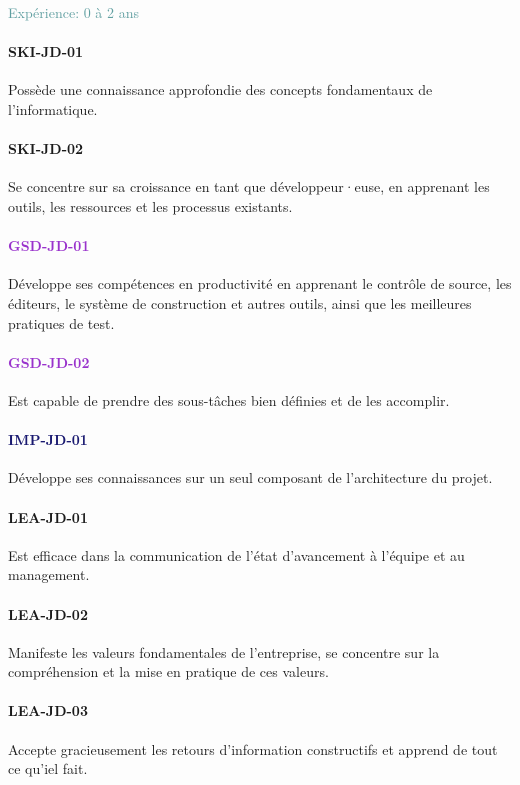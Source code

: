 \documentclass[a4paper, french, openany, 12pt]{book}
\newcommand\dex[1]{\textcolor{BrickRed}{\textbf{\uppercase{ski-{#1}}}}}
\newcommand\str[1]{\textcolor{DarkOrchid}{\textbf{\uppercase{gsd-{#1}}}}}
\newcommand\wis[1]{\textcolor{MidnightBlue}{\textbf{\uppercase{imp-{#1}}}}}
\newcommand\cha[1]{\textcolor{OliveGreen}{\textbf{\uppercase{lea-{#1}}}}}
\newcommand\xp[1]{\textcolor{CadetBlue}{Expérience: {#1} ans}}
\newcommand\dev{développeur·euse}
\begin{document}
\xp{0 à 2}

\begin{multicols}{2}

  \paragraph{\dex{jd-01}} 

  Possède une connaissance approfondie des concepts fondamentaux de l'informatique.

  \paragraph{\dex{jd-02}} 

  Se concentre sur sa croissance en tant que \dev, en apprenant les outils, les ressources et les processus 
  existants.

  \paragraph{\str{jd-01}}

  Développe ses compétences en productivité en apprenant le contrôle de source, les éditeurs, le système de construction 
  et autres outils, ainsi que les meilleures pratiques de test.

  \paragraph{\str{jd-02}}

  Est capable de prendre des sous-tâches bien définies et de les accomplir.

  \paragraph{\wis{jd-01}}

  Développe ses connaissances sur un seul composant de l'architecture du projet.

  \paragraph{\cha{jd-01}}

  Est efficace dans la communication de l'état d'avancement à l'équipe et au management.

  \paragraph{\cha{jd-02}}

  Manifeste les valeurs fondamentales de l'entreprise, se concentre sur la compréhension et la mise en pratique de ces 
  valeurs.

  \paragraph{\cha{jd-03}}

  Accepte gracieusement les retours d'information constructifs et apprend de tout ce qu'iel fait.
\end{multicols}
\end{document}
